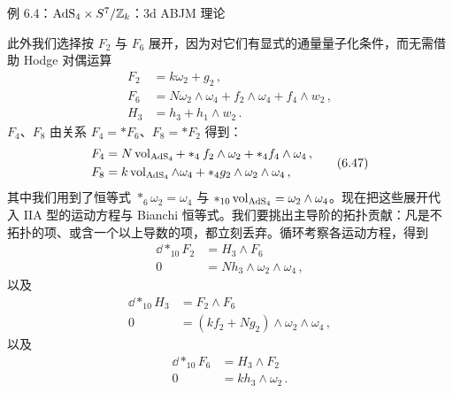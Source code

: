 \begin{examplebox}{例 6.4：$\mathrm{AdS}_4 \times S^7/\mathbb{Z}_k$：3d ABJM 理论}

此外我们选择按 $F_2$ 与 $F_6$ 展开，因为对它们有显式的通量量子化条件，而无需借助 Hodge 对偶运算
\begin{equation}
\begin{aligned}
F_2 &= k\omega_2 + g_2\,,\\
F_6 &= N\omega_2 \wedge \omega_4 + f_2 \wedge \omega_4 + f_4 \wedge w_2\,,\\
H_3 &= h_3 + h_1 \wedge w_2\,.
\end{aligned}\tag{6.46}
\end{equation}
$F_4$、$F_8$ 由关系 $F_4 = *F_6$、$F_8 = *F_2$ 得到：
\begin{equation}
\begin{aligned}
F_4 &= N\operatorname{vol}_{\mathrm{AdS}_4} + *_{4}f_2 \wedge \omega_2 + *_{4}f_4 \wedge \omega_4\,,\\
F_8 &= k\operatorname{vol}_{\mathrm{AdS}_4} \wedge \omega_4 + *_{4}g_2 \wedge \omega_2 \wedge \omega_4\,,
\end{aligned}\tag{6.47}
\end{equation}
其中我们用到了恒等式 $*_6\omega_2 = \omega_4$ 与 $*_{10}\operatorname{vol}_{\mathrm{AdS}_4} = \omega_2 \wedge \omega_4$。现在把这些展开代入 IIA 型的运动方程与 Bianchi 恒等式。我们要挑出主导阶的拓扑贡献：凡是不拓扑的项、或含一个以上导数的项，都立刻丢弃。循环考察各运动方程，得到
\begin{equation}
\begin{aligned}
\dd *_{10} F_2 &= H_3 \wedge F_6\\
0 &= N h_3 \wedge \omega_2 \wedge \omega_4\,,
\end{aligned}\tag{6.48}
\end{equation}
以及
\begin{equation}
\begin{aligned}
\dd *_{10} H_3 &= F_2 \wedge F_6\\
0 &= (k f_2 + N g_2) \wedge \omega_2 \wedge \omega_4\,,
\end{aligned}\tag{6.49}
\end{equation}
以及
\begin{equation}
\begin{aligned}
\dd *_{10} F_6 &= H_3 \wedge F_2\\
0 &= k h_3 \wedge \omega_2\,.
\end{aligned}\tag{6.50}

\end{equation}
\end{examplebox}
